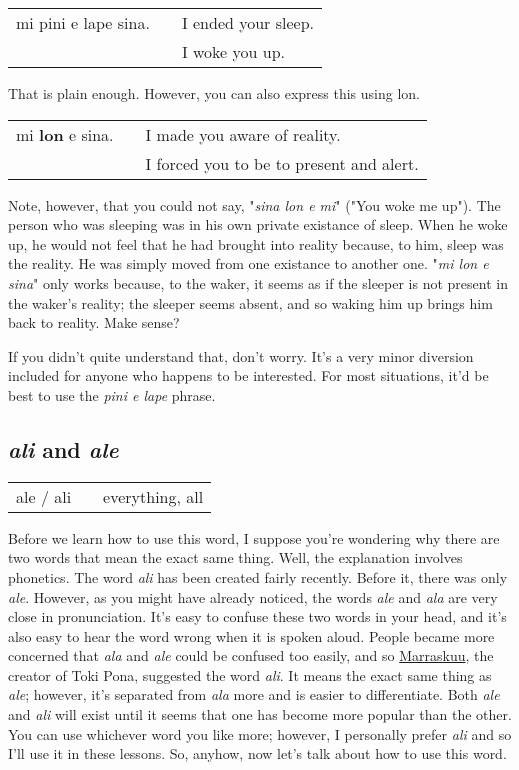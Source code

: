 \begin{supertabular}{p{5,5cm}|ll}
mi pini e lape sina. && I ended your sleep. \\ && I woke you up. \\
\end{supertabular} 

That is plain enough. 
However, you can also express this using lon.

\begin{supertabular}{p{5,5cm}|ll}
mi \textbf{lon} e sina. && I made you aware of reality. \\  && I forced you to be to present and alert. \\
\end{supertabular} 

Note, however, that you could not say, "\textit{sina lon e mi}" ("You woke me up"). 
The person who was sleeping was in his own private existance of sleep. 
When he woke up, he would not feel that he had brought into reality because, to him, sleep was the reality. 
He was simply moved from one existance to another one. 
"\textit{mi lon e sina}" only works because, to the waker, it seems as if the sleeper is not present in the waker's reality; the sleeper seems absent, and so waking him up brings him back to reality. 
Make sense? 

If you didn't quite understand that, don't worry. 
It's a very minor diversion included for anyone who happens to be interested. 
For most situations, it'd be best to use the \textit{pini e lape} phrase. 

\subsection*{\textit{ali} and \textit{ale}}

\begin{supertabular}{p{5,5cm}|ll}
ale / ali && everything, all \\
\end{supertabular}  

Before we learn how to use this word, I suppose you're wondering why there are two words that mean the exact same thing. 
Well, the explanation involves phonetics. 
The word \textit{ali} has been created fairly recently. 
Before it, there was only \textit{ale}. 
However, as you might have already noticed, the words \textit{ale} and \textit{ala} are very close in pronunciation. 
It's easy to confuse these two words in your head, and it's also easy to hear the word wrong when it is spoken aloud. 
People became more concerned that \textit{ala} and \textit{ale} could be confused too easily, and so \underline{Marraskuu}, the creator of Toki Pona, suggested the word \textit{ali}. 
It means the exact same thing as \textit{ale}; however, it's separated from \textit{ala} more and is easier to differentiate. 
Both \textit{ale} and \textit{ali} will exist until it seems that one has become more popular than the other. 
You can use whichever word you like more; however, I personally prefer \textit{ali} and so I'll use it in these lessons. 
So, anyhow, now let's talk about how to use this word. 

